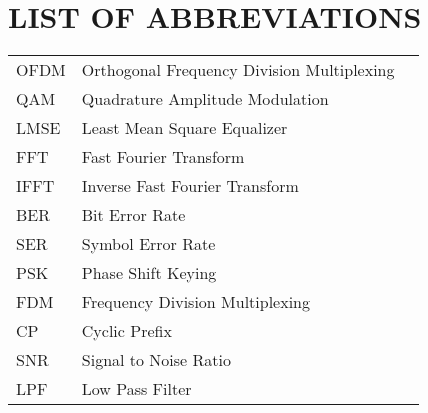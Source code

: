 \section*{LIST OF ABBREVIATIONS}
 {}

\begin{tabularx}{\textwidth}{ L{0.4} L{1.3} L{1.3} }
    OFDM    & Orthogonal Frequency Division Multiplexing \\
    QAM     & Quadrature Amplitude Modulation \\
    LMSE    & Least Mean Square Equalizer \\ %
    FFT     & Fast Fourier Transform \\
    IFFT    & Inverse Fast Fourier Transform \\
    BER     & Bit Error Rate \\
    SER     & Symbol Error Rate \\
    PSK     & Phase Shift Keying \\
    FDM     & Frequency Division Multiplexing \\
    CP      & Cyclic Prefix \\
    SNR     & Signal to Noise Ratio \\
    LPF     & Low Pass Filter \\

\end{tabularx}

\newpage